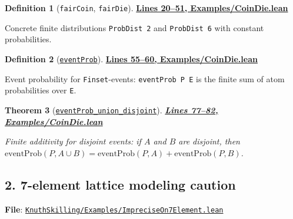 \documentclass[11pt]{article}
\newtheorem{theorem}{Theorem}[section]
\theoremstyle{definition}
\newtheorem{definition}[theorem]{Definition}
\theoremstyle{remark}
\begin{document}
\begin{definition}[\texttt{fairCoin}, \texttt{fairDie}]
\textbf{\href{https://github.com/zariuq/ks-foundations-of-inference/blob/main/KnuthSkilling/Examples/CoinDie.lean\#L20-L51}{Lines 20--51, Examples/CoinDie.lean}}

Concrete finite distributions \texttt{ProbDist 2} and \texttt{ProbDist 6} with constant probabilities.
\end{definition}

\begin{definition}[\href{https://github.com/zariuq/ks-foundations-of-inference/blob/main/KnuthSkilling/Examples/CoinDie.lean\#L59}{\texttt{eventProb}}]
\textbf{\href{https://github.com/zariuq/ks-foundations-of-inference/blob/main/KnuthSkilling/Examples/CoinDie.lean\#L55-L60}{Lines 55--60, Examples/CoinDie.lean}}

Event probability for \texttt{Finset}-events: \texttt{eventProb P E} is the finite sum of atom
probabilities over \texttt{E}.
\end{definition}

\begin{theorem}[\href{https://github.com/zariuq/ks-foundations-of-inference/blob/main/KnuthSkilling/Examples/CoinDie.lean\#L78}{\texttt{eventProb\_union\_disjoint}}]
\textbf{\href{https://github.com/zariuq/ks-foundations-of-inference/blob/main/KnuthSkilling/Examples/CoinDie.lean\#L77-L82}{Lines 77--82, Examples/CoinDie.lean}}

Finite additivity for disjoint events: if $A$ and $B$ are disjoint, then
$\mathrm{eventProb}(P, A \cup B)=\mathrm{eventProb}(P, A)+\mathrm{eventProb}(P, B)$.
\end{theorem}



\subsection*{2. 7-element lattice modeling caution}

\textbf{File}: \href{https://github.com/zariuq/ks-foundations-of-inference/blob/main/KnuthSkilling/Examples/ImpreciseOn7Element.lean}{\texttt{KnuthSkilling/Examples/ImpreciseOn7Element.lean}}
\end{document}
